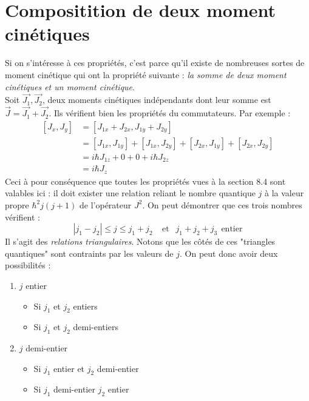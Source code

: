 \documentclass	[11pt, a4paper, openany]{book}
\begin{document}
	\section{Compositition de deux moment cinétiques}
	Si on s'intéresse à ces propriétés, c'est parce qu'il existe de nombreuses sortes
	de moment cinétique qui ont la propriété suivante : \textit{la somme de deux 
	moment cinétiques et un moment cinétique}.\\
	Soit $\vec{J_1},\vec{J_2}$, deux moments cinétiques indépendants dont leur 
	somme est $\vec{J} = \vec{J_1}+\vec{J_2}$. Ils vérifient bien les propriétés
	du commutateurs. Par exemple :
	\begin{equation}
	\begin{array}{ll}
	[J_x,J_y] &= [J_{1x}+J_{2x},J_{1y}+J_{2y}]\\
	 &= \left[J_{1x},J_{1y}\right]+\left[J_{1x},J_{2y}\right]+\left[J_{2x},J_{1y}\right]
	 +\left[J_{2x},J_{2y}\right]\\
	 &= i\hbar J_{1z } + 0 + 0 + i\hbar J_{2z}\\
	 &= i\hbar J_{z}
	\end{array}
	\end{equation}
	Ceci à pour conséquence que toutes les propriétés vues à la section 8.4 sont 
	valables ici : il doit exister une relation reliant le nombre quantique $j$ à
	la valeur propre $\hbar^2j(j+1)$ de l'opérateur $J^2$. On peut démontrer que 
	ces trois nombres vérifient :
	\begin{equation}
	|j_1-j_2| \leq j \leq j_1+j_2\ \ \ \ \ \text{et }\ \ j_1+j_2+j_3\ \ \text{entier}
	\end{equation}
	Il s'agit des \textit{relations triangulaires}. Notons que les côtés de ces 
	"triangles quantiques" sont contraints par les valeurs de $j$. On peut donc 
	avoir deux possibilités :
	\begin{enumerate}
	\item $j$ entier
		\begin{itemize}
		\item Si $j_1$ et $j_2$ entiers
		\item Si $j_1$ et $j_2$ demi-entiers
		\end{itemize}
	\item $j$ demi-entier
		\begin{itemize}
		\item Si $j_1$ entier et $j_2$ demi-entier
		\item Si $j_1$ demi-entier $j_2$ entier
		\end{itemize}
	\end{enumerate}
	
\end{document}
